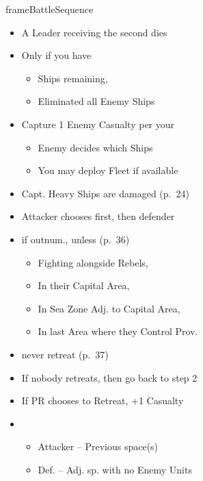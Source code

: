\documentclass[10pt]{article}
\newlength{\fhBattleSequence} \setlength\fhBattleSequence{31\baselineskip}
\begin{document}
\begin{dynamiccontents*}{frameBattleSequence}
\begin{eubox}{\fhBattleSequence}
\begin{multicols}{3}
\begin{itemize}
\begin{itemize}
				\item Enemy Leader gets 1\illhealth per your 2\tercios
			\end{itemize}
			\item A Leader receiving the second \illhealth dies
		\end{itemize}
		\begin{itemize}
			\item Only if you have
			\begin{itemize}
				\item Ships remaining, 
				\item Eliminated all Enemy Ships
			\end{itemize}
			\item Capture 1 Enemy Casualty per your \tercios
			\begin{itemize}
				\item Enemy decides which Ships 
				\item You may deploy Fleet if available
			\end{itemize}
			\item Capt. Heavy Ships are damaged (p.~24)
		\end{itemize}
		\begin{itemize}
			\item Attacker chooses first, then defender
			\item {} if outnum., unless (p.~36)
			\begin{itemize}
				\item Fighting alongside Rebels, 
				\item In their Capital Area, 
				\item In Sea Zone Adj. to Capital Area, 
				\item In last Area where they Control Prov.
			\end{itemize}
			\item {} never retreat (p.~37)
			\item If nobody retreats, then go back to step 2
			\item If PR chooses to Retreat, +1 Casualty
			\item {}
			\begin{itemize}
				\item Attacker -- Previous space(s)
				\item Def. -- Adj. sp. with no Enemy Units
				\begin{itemize}

\end{itemize}
\end{itemize}
\end{itemize}
\end{multicols}
\end{eubox}
\end{dynamiccontents*}
\end{document}
